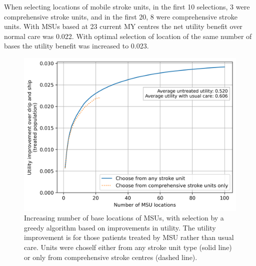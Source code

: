 When selecting locations of mobile stroke units, in the first 10 selections, 3 were comprehensive stroke units, and in the first 20, 8 were comprehensive stroke units. With MSUs based at 23 current MY centres the net utility benefit over normal care was 0.022. With optimal selection of location of the same number of bases the utility benefit was increased to 0.023.

\begin{figure}[h]
    \centering
    \includegraphics[width=0.5\linewidth]{images/msu_advantages_greedy.png}
    \caption{Increasing number of base locations of MSUs, with selection by a greedy algorithm based on improvements in utility. The utility improvement is for those patients treated by MSU rather than usual care. Units were choself either from any stroke unit type (solid line) or only from comprehensive stroke centres (dashed line).}
    \label{fig:greedy}
\end{figure}



